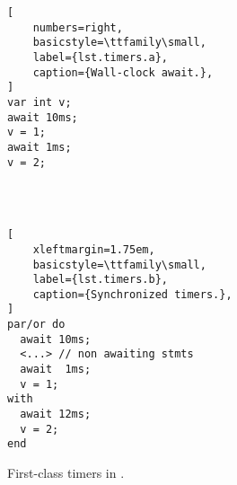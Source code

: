 \begin{figure}
\begin{minipage}[t]{0.37\linewidth}
\begin{lstlisting}[
    numbers=right,
    basicstyle=\ttfamily\small,
    label={lst.timers.a},
    caption={Wall-clock await.},
]
var int v;
await 10ms;
v = 1;
await 1ms;
v = 2;




\end{lstlisting}
\end{minipage}
%
\begin{minipage}[t]{0.59\linewidth}
\begin{lstlisting}[
    xleftmargin=1.75em,
    basicstyle=\ttfamily\small,
    label={lst.timers.b},
    caption={Synchronized timers.},
]
par/or do
  await 10ms;
  <...> // non awaiting stmts
  await  1ms;
  v = 1;
with
  await 12ms;
  v = 2;
end
\end{lstlisting}
\end{minipage}
\caption{ First-class timers in \CEU.
\label{lst.timers}
}
\end{figure}
